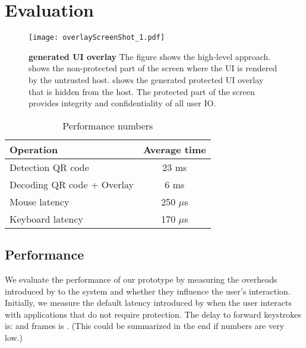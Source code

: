 \section{Evaluation}
\label{sec:eval}

\iffalse
\begin{figure}[t]
\centering
\texttt{[image: overlayScreenShot.pdf]}
\caption{\textbf{\name overlay}. }
\label{fig:screenshot_1}
\centering
\end{figure}
\fi


\begin{figure}[t]
\centering
\texttt{[image: overlayScreenShot\_1.pdf]}
\caption{\textbf{\device generated UI overlay} The figure shows the \name high-level approach. \one shows the non-protected part of the screen where the UI is rendered by the untrusted host. \two shows the \device generated protected UI overlay that is hidden from the host. The protected part of the screen provides integrity and confidentiality of all user IO.}
\spacesave
\label{fig:exampleImpelmentation}
\end{figure}


\begin{table}[t]
\centering
\begin{tabular}{l | c}
\textbf{Operation} & \textbf{Average time} \\\hline
Detection QR code & 23 ms\\
Decoding QR code + Overlay & 6 ms\\
Mouse latency & 250 $\mu$s\\
Keyboard latency & 170 $\mu$s\\\hline
\end{tabular} 
\caption{Performance numbers}\spacesave
\end{table}

\subsection{Performance}

We evaluate the performance of our prototype by measuring the overheads introduced by \name to the system and whether they influence the user's interaction. Initially, we measure the default latency introduced by \device when the user interacts with applications that do not require protection. The delay to forward keystrokes is:  and frames is . (This could be summarized in the end if numbers are very low.)

